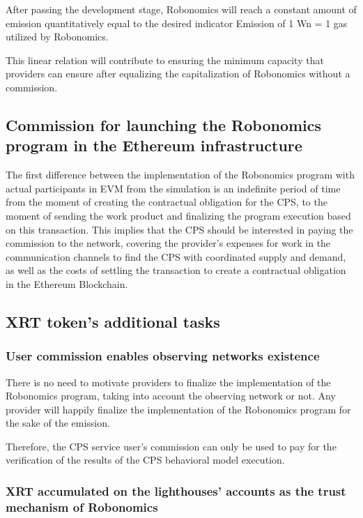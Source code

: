 \documentclass{article}
\begin{document}
After passing the development stage, Robonomics will reach a constant amount of emission quantitatively equal to the desired indicator Emission of 1 Wn = 1 gas utilized by Robonomics.

This linear relation will contribute to ensuring the minimum capacity that providers can ensure after equalizing the capitalization of Robonomics without a commission.

\subsection{Commission for launching the Robonomics program in the Ethereum infrastructure}

The first difference between the implementation of the Robonomics program with actual participants in EVM from the simulation is an indefinite period of time from the moment of creating the contractual obligation for the CPS, to the moment of sending the work product and finalizing the program execution based on this transaction. This implies that the CPS should be interested in paying the commission to the network, covering the provider's expenses for work in the communication channels to find the CPS with coordinated supply and demand, as well as the costs of settling the transaction to create a contractual obligation in the Ethereum Blockchain.

\subsection{XRT token's additional tasks}
\subsubsection{User commission enables observing networks existence}

There is no need to motivate providers to finalize the implementation of the Robonomics program, taking into account the observing network or not. Any provider will happily finalize the implementation of the Robonomics program for the sake of the emission.
 
Therefore, the CPS service user's commission can only be used to pay for the verification of the results of the CPS behavioral model execution.

\subsubsection{XRT accumulated on the lighthouses' accounts as the trust mechanism of Robonomics}
\end{document}
